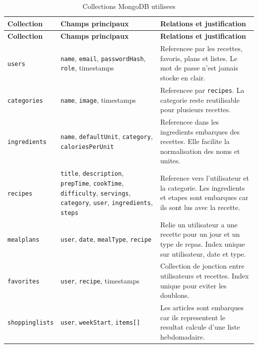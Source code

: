 \documentclass[12pt,a4paper]{report}
\begin{document}
\begin{longtable}{p{3cm}p{5cm}p{5cm}}
  \caption{Collections MongoDB utilisees}\\
  \toprule
  \textbf{Collection} & \textbf{Champs principaux} & \textbf{Relations et justification}\\
  \midrule
  \endfirsthead
  \toprule
  \textbf{Collection} & \textbf{Champs principaux} & \textbf{Relations et justification}\\
  \midrule
  \endhead
  \texttt{users} & \texttt{name}, \texttt{email}, \texttt{passwordHash}, \texttt{role}, timestamps & Referencee par les recettes, favoris, plans et listes. Le mot de passe n'est jamais stocke en clair.\\
  \texttt{categories} & \texttt{name}, \texttt{image}, timestamps & Referencee par \texttt{recipes}. La categorie reste reutilisable pour plusieurs recettes.\\
  \texttt{ingredients} & \texttt{name}, \texttt{defaultUnit}, \texttt{category}, \texttt{caloriesPerUnit} & Referencee dans les ingredients embarques des recettes. Elle facilite la normalisation des noms et unites.\\
  \texttt{recipes} & \texttt{title}, \texttt{description}, \texttt{prepTime}, \texttt{cookTime}, \texttt{difficulty}, \texttt{servings}, \texttt{category}, \texttt{user}, \texttt{ingredients}, \texttt{steps} & Reference vers l'utilisateur et la categorie. Les ingredients et etapes sont embarques car ils sont lus avec la recette.\\
  \texttt{mealplans} & \texttt{user}, \texttt{date}, \texttt{mealType}, \texttt{recipe} & Relie un utilisateur a une recette pour un jour et un type de repas. Index unique sur utilisateur, date et type.\\
  \texttt{favorites} & \texttt{user}, \texttt{recipe}, timestamps & Collection de jonction entre utilisateurs et recettes. Index unique pour eviter les doublons.\\
  \texttt{shoppinglists} & \texttt{user}, \texttt{weekStart}, \texttt{items[]} & Les articles sont embarques car ils representent le resultat calcule d'une liste hebdomadaire.\\
  \bottomrule
\end{longtable}
\end{document}
